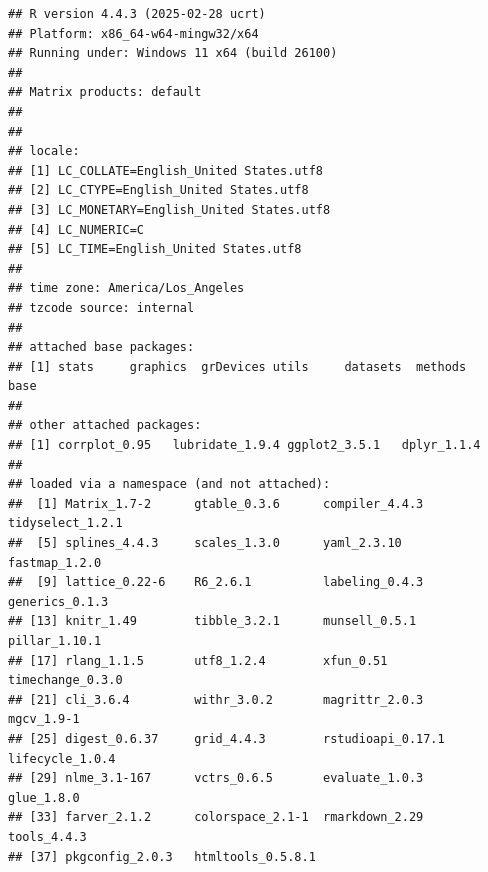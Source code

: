 \documentclass[
]{article}
\begin{document}
\begin{verbatim}
## R version 4.4.3 (2025-02-28 ucrt)
## Platform: x86_64-w64-mingw32/x64
## Running under: Windows 11 x64 (build 26100)
## 
## Matrix products: default
## 
## 
## locale:
## [1] LC_COLLATE=English_United States.utf8 
## [2] LC_CTYPE=English_United States.utf8   
## [3] LC_MONETARY=English_United States.utf8
## [4] LC_NUMERIC=C                          
## [5] LC_TIME=English_United States.utf8    
## 
## time zone: America/Los_Angeles
## tzcode source: internal
## 
## attached base packages:
## [1] stats     graphics  grDevices utils     datasets  methods   base     
## 
## other attached packages:
## [1] corrplot_0.95   lubridate_1.9.4 ggplot2_3.5.1   dplyr_1.1.4    
## 
## loaded via a namespace (and not attached):
##  [1] Matrix_1.7-2      gtable_0.3.6      compiler_4.4.3    tidyselect_1.2.1 
##  [5] splines_4.4.3     scales_1.3.0      yaml_2.3.10       fastmap_1.2.0    
##  [9] lattice_0.22-6    R6_2.6.1          labeling_0.4.3    generics_0.1.3   
## [13] knitr_1.49        tibble_3.2.1      munsell_0.5.1     pillar_1.10.1    
## [17] rlang_1.1.5       utf8_1.2.4        xfun_0.51         timechange_0.3.0 
## [21] cli_3.6.4         withr_3.0.2       magrittr_2.0.3    mgcv_1.9-1       
## [25] digest_0.6.37     grid_4.4.3        rstudioapi_0.17.1 lifecycle_1.0.4  
## [29] nlme_3.1-167      vctrs_0.6.5       evaluate_1.0.3    glue_1.8.0       
## [33] farver_2.1.2      colorspace_2.1-1  rmarkdown_2.29    tools_4.4.3      
## [37] pkgconfig_2.0.3   htmltools_0.5.8.1
\end{verbatim}
\end{document}
